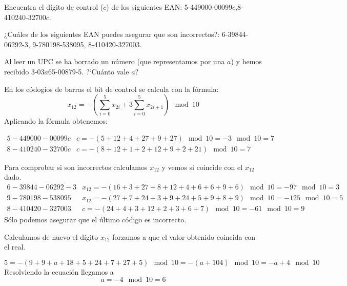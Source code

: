 \begin{problem}[1]
\ppart Encuentra el dígito de control ($c$) de los
siguientes EAN:
 5-449000-00099$c$,8-410240-32700$c$.

\ppart ¿Cuáles de los siguientes EAN puedes asegurar que son
incorrectos?: 6-39844-06292-3, 9-780198-538095, 8-410420-327003.

\ppart  Al leer un UPC se ha borrado un número (que representamos por
una $a$) y hemos recibido 3-03$a$65-00879-5. ?`Cuánto vale $a$?
\solution
{}

\spart

En los códogios de barras el bit de control se calcula con la fórmula:
\[x_{12} = -\left(\sum_{i=0}^5x_{2i} + 3 \sum_{i=0}^5x_{2i+1} \right)\mod 10\]
Aplicando la fórmula obtenemos:

\[\begin{array}{ll}
5-449000-00099c & c= -(5+12+4+27+9+27)  \mod 10 = -3 \mod 10 = 7\\
8-410240-32700c & c= -(8+12+1+2+12+9+2+21) \mod 10 = 7
\end{array}\]

\spart

Para comprobar si son incorrectos calculamos $x_{12}$ y vemos si coincide con el $x_{12}$ dado.
\small
\[\begin{array}{ll}
6-39844-06292-3 & x_{12} = -(16+3+27+8+12+4+6+6+9+6)  \mod 10 = -97 \mod 10 = 3\\
9-780198-538095 & x_{12} = -(27+7+24+3+9+24+5+9+8+9) \mod 10 = -125 \mod 10 = 5 \\
8-410420-327003 & c = -(24+4+3+12+2+3+6+7) \mod 10 = -61 \mod 10 = 9
\end{array}\]
\normalsize
Sólo podemos asegurar que el último código es incorrecto.

\spart

Calculamos de nuevo el dígito $x_{12}$ forzamos a que el valor obtenido coincida con el real.

\[5 = -(9+9+a+18+5+24+7+27+5)\mod 10 = -(a+104) \mod 10 = -a+4 \mod 10\]
Resolviendo la ecuación llegamos a
\[ a=-4 \mod 10 = 6\]


\end{problem}

